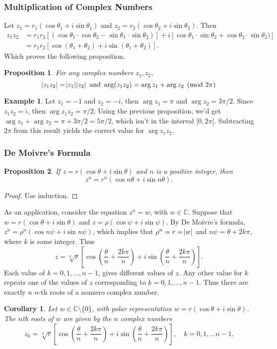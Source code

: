 \documentclass[12pt]{article}
\newcommand{\CC}{\mathbb{C}}
\newtheorem{corollary}{Corollary}[theorem]
\newtheorem{prop}{Proposition}[theorem]
\theoremstyle{definition}
\newtheorem{example}{Example}
\begin{document}
\subsubsection{Multiplication of Complex Numbers}
Let $z_1 = r_1(\cos \theta_1 + i \sin \theta_1)$ and $z_2 = r_2(\cos \theta_2 + i \sin \theta_2)$. Then
\begin{align*}
	z_1 z_2 &= r_1 r_2 [(\cos \theta_1 \cdot \cos \theta_2 - \sin \theta_1 \cdot \sin \theta_2)] + i[\cos \theta_1 \cdot \sin \theta_2 + \cos \theta_2 \cdot \sin \theta_2)] \\
		&= r_1 r_2 [\cos(\theta_1+\theta_2)+i \sin(\theta_1 + \theta_2)].
\end{align*}
Which proves the following proposition.
\begin{prop}
For any complex numbers $z_1, z_2$,
\[
	\abs{z_1 z_2} = \abs{z_1} \abs{z_2} \text{ and } \arg(z_1 z_2) = \arg z_1 + \arg z_2 \pmod {2\pi}
\]
\end{prop}
\begin{example}
	Let $z_1 = -1$ and $z_2 = -i$, then $\arg z_1 = \pi$ and $\arg z_2 = 3 \pi /2$. Since $z_1 z_2 = i$, then $\arg z_1 z_2 = \pi/2$. Using the previous proposition, we'd get $\arg z_1 + \arg z_2 = \pi + 3 \pi/2 = 5 \pi /2$, which isn't in the interval $[0,2 \pi[$. Subtracting $2 \pi$ from this result yields the correct value for $\arg z_1 z_2$.	
\end{example}
\subsubsection{De Moivre's Formula}
\begin{prop}
	If $z =  r(\cos \theta + i \sin \theta)$ and $n$ is a positive integer, then
	\[
		z^n = r^n(\cos n \theta + i \sin n\theta).
	\]
\end{prop}
\begin{proof}
	Use induction.	
\end{proof}
As an application, consider the equation $z^n = w$, with $w \in \CC$. Suppose that $w = r(\cos \theta + i \sin \theta)$ and $z = \rho ( \cos \psi + i \sin \psi )$. By De Moivre's formula, $z^n = \rho^n(\cos n \psi + i \sin n \psi)$, which implies that $\rho^n = r = \abs{w}$ and $n \psi = \theta + 2k \pi$, where $k$ is some integer. Thus
\[
	z = \sqrt[n]{r} \left [ \cos \left (\frac{\theta}{n} + \frac{2k\pi}{n} \right ) + i \sin \left (  \frac{\theta}{n} + \frac{2k\pi}{n} \right ) \right ].
\]
Each value of $k = 0, 1, \dots, n-1$, gives different values of $z$. Any other value for $k$ repeats one of the values of $z$ corresponding to $k = 0, 1, \ldots, n-1$. Thus there are exactly $n$ $n$-th roots of a nonzero complex number.
\begin{corollary}
	Let $w \in \CC \setminus \{ 0 \}$, with polar representation $w = r ( \cos \theta + i \sin \theta)$. The $n$th roots of $w$ are given by the $n$ complex numbers
	\[ 
		z_k = \sqrt[n]{r} \left [ \cos \left (\frac{\theta}{n} + \frac{2k\pi}{n} \right ) + i \sin \left (  \frac{\theta}{n} + \frac{2k\pi}{n} \right ) \right ], \quad k = 0, 1, \ldots n-1.
	\]
\end{corollary}
\end{document}

